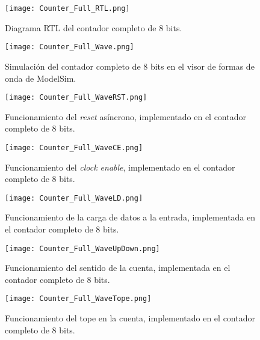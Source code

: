 \begin{figure}[ht]
	\centering
	\texttt{[image: Counter\_Full\_RTL.png]}
	\caption{Diagrama RTL del contador completo de 8 bits. \label{fig:counter_full_rtl}}
\end{figure}

\begin{figure}[ht]
	\centering
	\texttt{[image: Counter\_Full\_Wave.png]}
	\caption{Simulación del contador completo de 8 bits en el visor de formas de onda de ModelSim. \label{fig:counter_full_wave}}
\end{figure}

\begin{figure}[ht]
	\centering
	\texttt{[image: Counter\_Full\_WaveRST.png]}
	\caption {Funcionamiento del \textit{reset} asíncrono, implementado en el contador completo de 8 bits. \label{fig:counter_full_waverst}}
\end{figure}

\begin{figure}[ht]
	\centering
	\texttt{[image: Counter\_Full\_WaveCE.png]}
	\caption{Funcionamiento del \textit{clock enable}, implementado en el contador completo de 8 bits. \label{fig:counter_full_wavece}}
\end{figure}

\begin{figure}[ht]
	\centering
	\texttt{[image: Counter\_Full\_WaveLD.png]}
	\caption{Funcionamiento de la carga de datos a la entrada, implementada en el contador completo de 8 bits. \label{fig:counter_full_waveld}}
\end{figure}

\begin{figure}[ht]
	\centering
	\texttt{[image: Counter\_Full\_WaveUpDown.png]}
	\caption{Funcionamiento del sentido de la cuenta, implementada en el contador completo de 8 bits. \label{fig:counter_full_waveupdown}}
\end{figure}

\begin{figure}[ht]
	\centering
	\texttt{[image: Counter\_Full\_WaveTope.png]}
	\caption{Funcionamiento del tope en la cuenta, implementado en el contador completo de 8 bits. \label{fig:counter_full_wavetope}}
\end{figure}